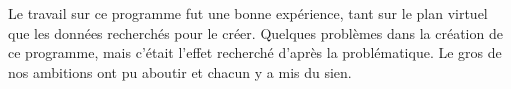 Le travail sur ce programme fut une bonne expérience, tant sur le plan virtuel que les données recherchés pour le créer. Quelques problèmes dans la création de ce programme, mais c'était l'effet recherché d'après la problématique. Le gros de nos ambitions ont pu aboutir et chacun y a mis du sien.
